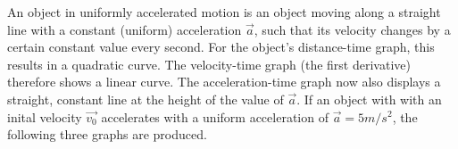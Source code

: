 \begin{figure}[h!]
	\centering
	
	
\end{figure}

\pagebreak


An object in uniformly accelerated motion is an object moving along a straight line with a constant (uniform) acceleration $\vec{a}$, such that its velocity changes by a certain constant value every second. For the object's distance-time graph, this results in a quadratic curve. The velocity-time graph (the first derivative) therefore shows a linear curve. The acceleration-time graph now also displays a straight, constant line at the height of the value of $\vec{a}$. If an object with with an inital velocity $\vec{v_0}$ accelerates with a uniform acceleration of $\vec{a} = 5 m/s^2$, the following three graphs are produced.

